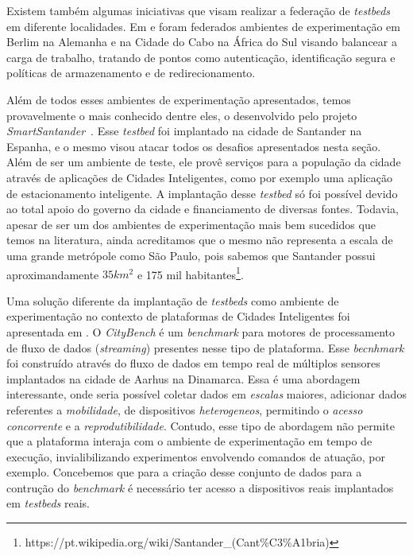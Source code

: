 Existem também algumas iniciativas que visam realizar a federação de \textit{testbeds} em diferente localidades.
Em \cite{mwangama_2013} e \cite{corici_2014} foram federados ambientes de experimentação em Berlim na Alemanha e na Cidade do Cabo na África do Sul visando balancear a carga de trabalho,
tratando de pontos como autenticação, identificação segura e políticas de armazenamento e de redirecionamento.

Além de todos esses ambientes de experimentação apresentados, temos provavelmente o mais conhecido dentre eles, o desenvolvido pelo projeto \textit{SmartSantander}~\citep{sanchez_2014}.
Esse \textit{testbed} foi implantado na cidade de Santander na Espanha, e o mesmo visou atacar todos os desafios apresentados nesta seção.
Além de ser um ambiente de teste, ele provê serviços para a população da cidade através de aplicações de Cidades Inteligentes, como por exemplo uma aplicação de estacionamento inteligente.
A implantação desse \textit{testbed} só foi possível devido ao total apoio do governo da cidade e financiamento de diversas fontes.
Todavia, apesar de ser um dos ambientes de experimentação mais bem sucedidos que temos na literatura, ainda acreditamos que o mesmo não representa a escala de uma grande metrópole como
São Paulo, pois sabemos que Santander possui aproximandamente $ 35 km^2 $ e 175 mil habitantes\footnote{https://pt.wikipedia.org/wiki/Santander\_(Cant\%C3\%A1bria)}.

Uma solução diferente da implantação de \textit{testbeds} como ambiente de experimentação no contexto de plataformas de Cidades Inteligentes foi apresentada em \cite{ali_2015}.
O \textit{CityBench} é um \textit{benchmark} para motores de processamento de fluxo de dados (\textit{streaming}) presentes nesse tipo de plataforma.
Esse \textit{becnhmark} foi construído através do fluxo de dados em tempo real de múltiplos sensores implantados na cidade de Aarhus na Dinamarca.
Essa é uma abordagem interessante, onde seria possível coletar dados em \textit{escalas} maiores, adicionar dados referentes a \textit{mobilidade}, de dispositivos \textit{heterogeneos}, permitindo
o \textit{acesso concorrente} e a \textit{reprodutibilidade}.
Contudo, esse tipo de abordagem não permite que a plataforma interaja com o ambiente de experimentação em tempo de execução, invialibilizando experimentos envolvendo comandos de atuação, por exemplo.
Concebemos que para a criação desse conjunto de dados para a contrução do \textit{benchmark} é necessário ter acesso a dispositivos reais implantados em \textit{testbeds} reais.


